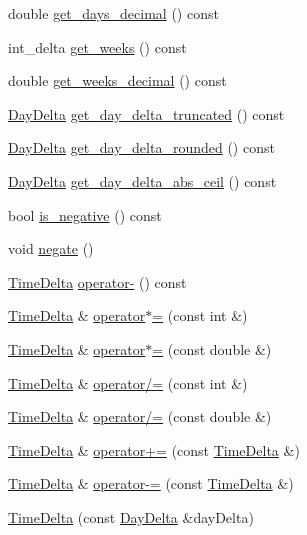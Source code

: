 \begin{DoxyCompactItemize}
\item 
double \hyperlink{structTimeDelta_a76f968368aff4b45c80b0b147c417fd3}{get\-\_\-days\-\_\-decimal} () const 
\item 
int\-\_\-delta \hyperlink{structTimeDelta_aab4f773272785b9421b101ee243c0eaf}{get\-\_\-weeks} () const 
\item 
double \hyperlink{structTimeDelta_a927aad8d85f646d3712ded9c09ae957a}{get\-\_\-weeks\-\_\-decimal} () const 
\item 
\hyperlink{structDayDelta}{\-Day\-Delta} \hyperlink{structTimeDelta_a159836075fddd7cef439a08b206f0e97}{get\-\_\-day\-\_\-delta\-\_\-truncated} () const 
\item 
\hyperlink{structDayDelta}{\-Day\-Delta} \hyperlink{structTimeDelta_a188dd345b8e7eeceff4320103c727d15}{get\-\_\-day\-\_\-delta\-\_\-rounded} () const 
\item 
\hyperlink{structDayDelta}{\-Day\-Delta} \hyperlink{structTimeDelta_a50d3fe29ff74cd653c6b063c0ba05528}{get\-\_\-day\-\_\-delta\-\_\-abs\-\_\-ceil} () const 
\item 
bool \hyperlink{structTimeDelta_acc2faf0e9a1563c84fb68cad42521c54}{is\-\_\-negative} () const 
\item 
void \hyperlink{structTimeDelta_a858c8d0eae6070a24ba7fd3e18a3cf3f}{negate} ()
\item 
\hyperlink{structTimeDelta}{\-Time\-Delta} \hyperlink{structTimeDelta_a660df6f5ba7291bef24d5a05639563b6}{operator-\/} () const 
\item 
\hyperlink{structTimeDelta}{\-Time\-Delta} \& \hyperlink{structTimeDelta_ae317349e9984990e3d2ff2489036055b}{operator$\ast$=} (const int \&)
\item 
\hyperlink{structTimeDelta}{\-Time\-Delta} \& \hyperlink{structTimeDelta_a9d7e96eccef60bf752488a94b6b54939}{operator$\ast$=} (const double \&)
\item 
\hyperlink{structTimeDelta}{\-Time\-Delta} \& \hyperlink{structTimeDelta_a099195e2bc83ea7f217a566732c8037d}{operator/=} (const int \&)
\item 
\hyperlink{structTimeDelta}{\-Time\-Delta} \& \hyperlink{structTimeDelta_aaf7f4de78973da02b04891bab2f49ca3}{operator/=} (const double \&)
\item 
\hyperlink{structTimeDelta}{\-Time\-Delta} \& \hyperlink{structTimeDelta_a71cc0f1b1f3bf080e34a73902b1a1a81}{operator+=} (const \hyperlink{structTimeDelta}{\-Time\-Delta} \&)
\item 
\hyperlink{structTimeDelta}{\-Time\-Delta} \& \hyperlink{structTimeDelta_aca3281505a032868194e2e9a890b2e49}{operator-\/=} (const \hyperlink{structTimeDelta}{\-Time\-Delta} \&)
\item 
\hyperlink{structTimeDelta_a57ef1bc875d370aaaf8ce7c4aba1cd75}{\-Time\-Delta} (const \hyperlink{structDayDelta}{\-Day\-Delta} \&day\-Delta)
\end{DoxyCompactItemize}
